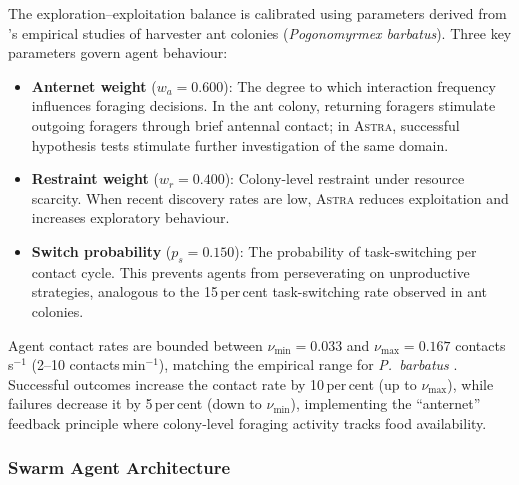 \documentclass[usenatbib]{rasti}
\newcommand{\astra}{\textsc{Astra}\xspace}
\begin{document}
The exploration--exploitation balance is calibrated using parameters derived from \citet{Gordon2010}'s empirical studies of harvester ant colonies (\textit{Pogonomyrmex barbatus}).
Three key parameters govern agent behaviour:
\begin{itemize}
  \item \textbf{Anternet weight} ($w_a = 0.600$): The degree to which interaction frequency influences foraging decisions. In the ant colony, returning foragers stimulate outgoing foragers through brief antennal contact; in \astra, successful hypothesis tests stimulate further investigation of the same domain.
  \item \textbf{Restraint weight} ($w_r = 0.400$): Colony-level restraint under resource scarcity. When recent discovery rates are low, \astra reduces exploitation and increases exploratory behaviour.
  \item \textbf{Switch probability} ($p_s = 0.150$): The probability of task-switching per contact cycle. This prevents agents from perseverating on unproductive strategies, analogous to the 15\,per\,cent task-switching rate observed in ant colonies.
\end{itemize}
Agent contact rates are bounded between $\nu_{\min} = 0.033$ and $\nu_{\max} = 0.167$ contacts\,s$^{-1}$ (2--10 contacts\,min$^{-1}$), matching the empirical range for \textit{P.\ barbatus} \citep{Gordon2010}.
Successful outcomes increase the contact rate by 10\,per\,cent (up to $\nu_{\max}$), while failures decrease it by 5\,per\,cent (down to $\nu_{\min}$), implementing the ``anternet'' feedback principle where colony-level foraging activity tracks food availability.

\subsubsection{Swarm Agent Architecture}
\end{document}
